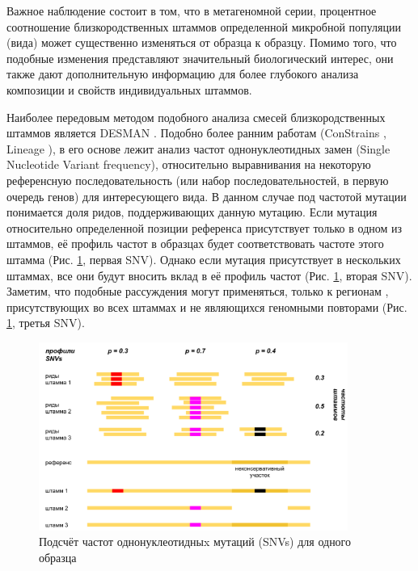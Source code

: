 \documentclass{spbau-diploma}
\begin{document}
Важное наблюдение состоит в том, что в метагеномной серии, процентное соотношение близкородственных штаммов определенной микробной популяции (вида) может существенно изменяться от образца к образцу. Помимо того, что подобные изменения представляют значительный биологический интерес, они также дают дополнительную информацию для более глубокого анализа композиции и свойств индивидуальных штаммов.

Наиболее передовым методом подобного анализа смесей близкородственных штаммов является DESMAN \cite{DESMAN}.
Подобно более ранним работам (ConStrains \cite{Constrains}, Lineage \cite{Lineage}), в его основе лежит анализ частот однонуклеотидных замен (Single Nucleotide Variant frequency), относительно выравнивания на некоторую референсную последовательность (или набор последовательностей, в первую очередь генов) для интересующего вида. В данном случае под частотой мутации понимается доля ридов, поддерживающих данную мутацию. Если мутация относительно определенной позиции референса присутствует только в одном из штаммов, её профиль частот в образцах будет соответствовать частоте этого штамма (Рис. \ref{snv_profile}, первая SNV). Однако если мутация присутствует в нескольких штаммах, все они будут вносить вклад в её профиль частот (Рис. \ref{snv_profile}, вторая SNV). Заметим, что подобные рассуждения могут применяться, только к регионам , присутствующих во всех штаммах и не являющихся геномными повторами (Рис. \ref{snv_profile}, третья SNV). 


\begin{figure}[t]
\centering
\includegraphics[width=0.9\textwidth]{pics/snv_profiles.png}
\caption{Подсчёт частот однонуклеотидныx мутаций (SNVs) для одного образца}
\label{snv_profile}
\end{figure}
\end{document}

